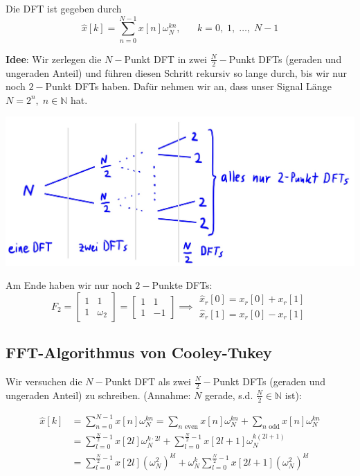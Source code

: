 \documentclass[11pt]{article}
\begin{document}
Die DFT ist gegeben durch 
$$\hat{x}[k] = \sum_{n=0}^{N-1} x[n]\omega_N^{kn}, \hspace{20pt} k=0, \; 1, \; \dots, \; N-1$$

\vspace*{-0.5cm}
\textbf{Idee}: Wir zerlegen die $N-$Punkt DFT in zwei $\frac{N}{2}-$Punkt DFTs (geraden und ungeraden Anteil) und führen diesen Schritt rekursiv so lange durch, bis wir nur noch $2-$Punkt DFTs haben. Dafür nehmen wir an, dass unser Signal Länge $N=2^n, \; n \in \mathbb{N}$ hat.

\vspace*{-0.75cm}
\begin{center}
    \includegraphics[width=0.5\linewidth]{docimgs/Rekursionsbaum.jpeg}
\end{center}

\vspace*{-0.5cm}
Am Ende haben wir nur noch $2-$Punkte DFTs:
$$F_2 = \begin{bmatrix}
    1 & 1 \\
    1 & \omega_2
\end{bmatrix} = \begin{bmatrix}
    1 & 1 \\
    1 & -1
\end{bmatrix} \implies \begin{array}{l}
    \hat{x}_r[0] = x_r[0] + x_r[1] \\
    \hat{x}_r[1] = x_r[0] - x_r[1]
\end{array}$$

\vspace*{-0.5cm}
\subsection*{FFT-Algorithmus von Cooley-Tukey}
\vspace*{-0.5cm}
Wir versuchen die $N-$Punkt DFT als zwei $\frac{N}{2}-$Punkt DFTs (geraden und ungeraden Anteil) zu schreiben. (Annahme: $N$ gerade, s.d. $\frac{N}{2} \in \mathbb{N}$ ist):

\vspace*{-0.5cm}
\begin{align*}
    \hat{x}[k] &= \sum_{n=0}^{N-1} x[n]\omega_N^{kn} = \sum_{n\text{ even}} x[n]\omega_N^{kn} + \sum_{n\text{ odd}} x[n]\omega_N^{kn} \\
    &= \sum_{l=0}^{\frac{N}{2}-1} x[2l]\omega_N^{k\cdot 2l} + \sum_{l=0}^{\frac{N}{2}-1} x[2l+1]\omega_N^{k(2l+1)} \\
    &= \sum_{l=0}^{\frac{N}{2}-1}x[2l]\left(\omega_N^2\right)^{kl} + \omega_N^k \sum_{l=0}^{\frac{N}{2}-1} x[2l+1] \left(\omega_N^2\right)^{kl}
\end{align*}
\end{document}
